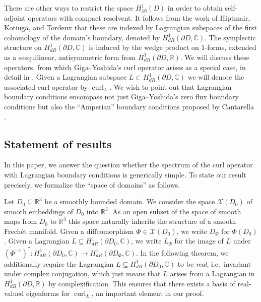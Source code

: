 \documentclass[11pt,reqno]{amsart}
\DeclareMathOperator{\curl}{curl}
\begin{document}
There are other ways to restrict the space $H^1_{\partial\partial}(D)$ in order to obtain self-adjoint operators with compact resolvent. It follows from the work of Hiptmair, Kotiuga, and Tordeux \cite{HiptmairKotiugaTordeux2012} that these are indexed by Lagrangian subspaces of the first cohomology of the domain's boundary, denoted by $H^1_{dR}(\partial D,\mathbb C)$. The symplectic structure on $H^1_{dR}(\partial D, \mathbb C)$ is induced by the wedge product on $1$-forms, extended as a sesquilinear, antisymmetric form from $H^1_{dR}(\partial D,\mathbb R)$. We will discuss these operators, from which Giga--Yoshida's curl operator arises as a special case, in detail in . Given a Lagrangian subspace $L\subset H^1_{dR}(\partial D,\mathbb C)$ we will denote the associated curl operator by $\curl_L$. We wish to point out that Lagrangian boundary conditions encompass not just Giga--Yoshida's zero flux boundary conditions but also the ``Amperian'' boundary conditions proposed by Cantarella \cite{Cantarella1999}.

\subsection{Statement of results}
In this paper, we answer the question whether the spectrum of the curl operator with Lagrangian boundary conditions is generically simple. To state our result precisely, we formalize the ``space of domains'' as follows.

Let $D_0 \subseteq \mathbb R^3$ be a smoothly bounded domain. We consider the space $\mathcal X(D_0)$ of smooth embeddings of $\bar D_0$ into $\mathbb R^3$. As an open subset of the space of smooth maps from $\bar D_0$ to $\mathbb R^3$ this space naturally inherits the structure of a smooth Frech\'et manifold. Given a diffeomorphism $\Phi \in \mathcal X(D_0)$, we write $D_\Phi$ for $\Phi(D_0)$. Given a Lagrangian $L \subseteq H^1_{dR}(\partial D_0,\mathbb C)$, we write $L_\Phi$ for the image of $L$ under $(\Phi^{-1})^\ast: H^1_{dR}(\partial D_0,\mathbb C) \to H^1_{dR}(\partial D_{\Phi},\mathbb C)$. In the following theorem, we additionally require the Lagrangian $L \subseteq H^1_{dR}(\partial D_0,\mathbb C)$ to be \emph{real}, i.e.\ invariant under complex conjugation, which just means that $L$ arises from a Lagrangian in $H^1_{dR}(\partial D,\mathbb R)$ by complexification. This ensures that there exists a basis of real-valued eigenforms for $\curl_L$, an important element in our proof.
\end{document}
